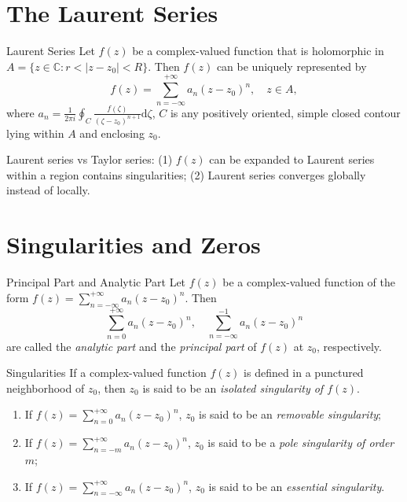 

\section{The Laurent Series}

\begin{theorem}{Laurent Series}{}
  Let $f(z)$ be a complex-valued function that is holomorphic in $A = \{z \in \mathbb{C}: r < |z-z_0| < R\}$.
  Then $f(z)$ can be uniquely represented by
  \begin{equation}
    f(z) = \sum\limits_{n = -\infty}^{+\infty} a_n(z-z_0)^n, \quad z \in A,
  \end{equation}
  where $a_n = \frac{1}{2\pi i} \oint_C \frac{f(\zeta)}{(\zeta - z_0)^{n+1}}\mathrm{d} \zeta$,
  $C$ is any positively oriented, simple closed contour lying within $A$ and enclosing $z_0$.
\end{theorem}

\begin{note}
  Laurent series vs Taylor series:
  (1) $f(z)$ can be expanded to Laurent series within a region contains singularities;
  (2) Laurent series converges globally instead of locally.
\end{note}


\section{Singularities and Zeros}

\begin{definition}{Principal Part and Analytic Part}{}
  Let $f(z)$ be a complex-valued function of the form $f(z) = \sum_{n = -\infty}^{+\infty}a_n(z-z_0)^n$.
  Then
  \begin{equation}
    \sum\limits_{n = 0}^{+\infty}a_n(z-z_0)^n, \quad
    \sum\limits_{n = -\infty}^{-1}a_n (z-z_0)^n
  \end{equation}
  are called the \emph{analytic part}
  and the \emph{principal part} of $f(z)$ at $z_0$, respectively.
\end{definition}

\begin{definition}{Singularities}{}
  If a complex-valued function $f(z)$ is defined in a punctured neighborhood of $z_0$,
  then $z_0$ is said to be an \emph{isolated singularity of $f(z)$}.
  \begin{enumerate}
  \item If $f(z) = \sum_{n = 0}^{+\infty}a_n(z-z_0)^n$, $z_0$ is said to be an \emph{removable singularity};
  \item If $f(z) = \sum_{n=-m}^{+\infty}a_n(z-z_0)^n$, $z_0$ is said to be a \emph{pole singularity of order $m$};
  \item If $f(z) = \sum_{n = -\infty}^{+\infty}a_n(z-z_0)^n$, $z_0$ is said to be an \emph{essential singularity}.
  \end{enumerate}
\end{definition}

